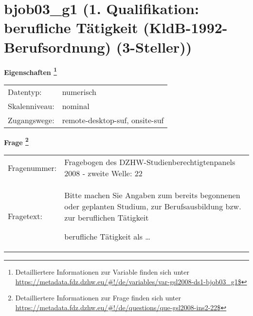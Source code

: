 
    \setcounter{footnote}{0}

    \vspace*{-1.8cm}
	\section{bjob03\_g1 (1. Qualifikation: berufliche Tätigkeit (KldB-1992-Berufsordnung) (3-Steller))}
	\label{section:bjob03_g1}



    \vspace*{0.5cm}
    \noindent\textbf{Eigenschaften
	\footnote{Detailliertere Informationen zur Variable finden sich unter
		\url{https://metadata.fdz.dzhw.eu/\#!/de/variables/var-gsl2008-ds1-bjob03_g1$}}}\\
	\begin{tabularx}{\hsize}{@{}lX}
	Datentyp: & numerisch \\
	Skalenniveau: & nominal \\
	Zugangswege: &
	  remote-desktop-suf, 
	  onsite-suf
 \\
    \end{tabularx}



				\vspace*{0.5cm}
                \noindent\textbf{Frage
	                \footnote{Detailliertere Informationen zur Frage finden sich unter
		              \url{https://metadata.fdz.dzhw.eu/\#!/de/questions/que-gsl2008-ins2-22$}}}\\
				\begin{tabularx}{\hsize}{@{}lX}
					Fragenummer: &
					  Fragebogen des DZHW-Studienberechtigtenpanels 2008 - zweite Welle:
					  22
 \\
					Fragetext: & Bitte machen Sie Angaben zum bereits begonnenen oder geplanten Studium, zur Berufsausbildung bzw. zur beruflichen Tätigkeit\par  berufliche Tätigkeit als … \\
				\end{tabularx}





